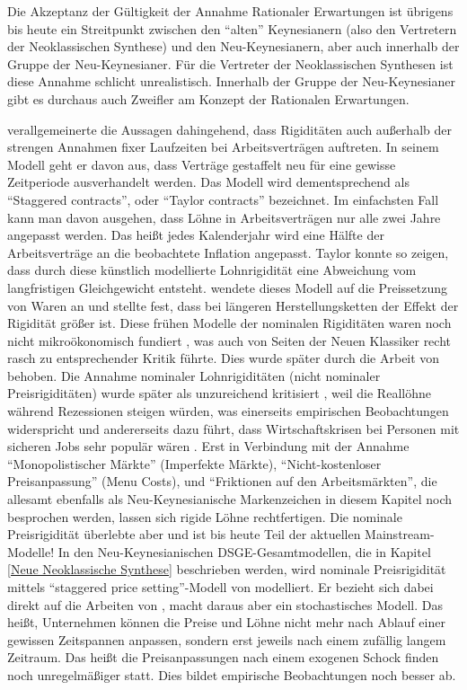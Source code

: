 Die Akzeptanz der Gültigkeit der Annahme Rationaler Erwartungen ist übrigens bis heute ein Streitpunkt zwischen den "`alten"' Keynesianern (also den Vertretern der Neoklassischen Synthese) und den Neu-Keynesianern, aber auch innerhalb der Gruppe der Neu-Keynesianer. Für die Vertreter der Neoklassischen Synthesen ist diese Annahme schlicht unrealistisch. Innerhalb der Gruppe der Neu-Keynesianer gibt es durchaus auch Zweifler am Konzept der Rationalen Erwartungen.

\textcite{Taylor1979, Taylor1980} verallgemeinerte die Aussagen dahingehend, dass Rigiditäten auch außerhalb der strengen Annahmen fixer Laufzeiten bei Arbeitsverträgen auftreten. In seinem Modell geht er davon aus, dass Verträge gestaffelt neu für eine gewisse Zeitperiode ausverhandelt werden. Das Modell wird dementsprechend als "`Staggered contracts"', oder "`Taylor contracts"' bezeichnet. Im einfachsten Fall kann man davon ausgehen, dass Löhne in Arbeitsverträgen nur alle zwei Jahre angepasst werden. Das heißt jedes Kalenderjahr wird eine Hälfte der Arbeitsverträge an die beobachtete Inflation angepasst. Taylor konnte so zeigen, dass durch diese künstlich modellierte Lohnrigidität eine Abweichung vom langfristigen Gleichgewicht entsteht. \textcite{Blanchard1983} wendete dieses Modell auf die Preissetzung von Waren an und stellte fest, dass bei längeren Herstellungsketten der Effekt der Rigidität größer ist. Diese frühen Modelle der nominalen Rigiditäten waren noch nicht mikroökonomisch fundiert \parencite[S. 194]{Fischer1977}, was auch von Seiten der Neuen Klassiker recht rasch zu entsprechender Kritik führte. Dies wurde später durch die Arbeit von \textcite{Rotemberg1987} behoben. Die Annahme nominaler Lohnrigiditäten (nicht nominaler Preisrigiditäten) wurde später als unzureichend kritisiert \parencite{Mankiw1990}, weil die Reallöhne während Rezessionen steigen würden, was einerseits empirischen Beobachtungen widerspricht und andererseits dazu führt, dass Wirtschaftskrisen bei Personen mit sicheren Jobs sehr populär wären \parencite[S. 371]{Snowdon2005}. Erst in Verbindung mit der Annahme "`Monopolistischer Märkte"' (Imperfekte Märkte), "`Nicht-kostenloser Preisanpassung"' (Menu Costs), und "`Friktionen auf den Arbeitsmärkten"', die allesamt ebenfalls als Neu-Keynesianische Markenzeichen in diesem Kapitel noch besprochen werden, lassen sich rigide Löhne rechtfertigen.
Die nominale Preisrigidität überlebte aber und ist bis heute Teil der aktuellen Mainstream-Modelle! In den  Neu-Keynesianischen DSGE-Gesamtmodellen, die in Kapitel \ref{Neue Neoklassische Synthese} beschrieben werden, wird nominale Preisrigidität mittels "`staggered price setting"'-Modell von \textcite{Calvo1983} modelliert. Er bezieht sich dabei direkt auf die Arbeiten von \textcite{Taylor1979, Taylor1980}, macht daraus aber ein stochastisches Modell. Das heißt, Unternehmen können die Preise und Löhne nicht mehr nach Ablauf einer gewissen Zeitspannen anpassen, sondern erst jeweils nach einem zufällig langem Zeitraum. Das heißt die Preisanpassungen nach einem exogenen Schock finden noch unregelmäßiger statt. Dies bildet empirische Beobachtungen noch besser ab. 

